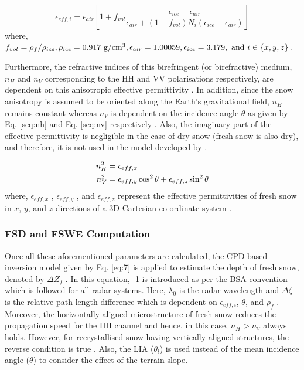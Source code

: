 \documentclass[review]{elsarticle}
\numberwithin{equation}{section}
\numberwithin{figure}{section}
\numberwithin{table}{section}
\begin{document}
\begin{equation}
    \label{eq:5}
	\epsilon_{eff, i} = \epsilon_{air}\left[1 + f_{vol}\frac{\epsilon_{ice} - \epsilon_{air}}{\epsilon_{air} + \left(1 - f_{vol}\right)N_i\left(\epsilon_{ice} - \epsilon_{air}\right)}\right]
\end{equation}
where, $f_{vol} = \rho_f / {\rho_{ice}}, \rho_{ice} = 0.917 \text{ g/cm\textsuperscript{3}}, \epsilon_{air} = 1.00059, \epsilon_{ice} = 3.179, \text{ and } i \in \{x, y, z\}$.

Furthermore, the refractive indices of this birefringent (or birefractive) medium, $n_H$ and $n_V$ corresponding to the HH and VV polarisations respectively, are dependent on this anisotropic effective permittivity \citep{Leinss2014}. In addition, since the snow anisotropy is assumed to be oriented along the Earth’s gravitational field, $n_H$ remains constant whereas $n_V$ is dependent on the incidence angle $\theta$ as given by Eq. \eqref{seq:nh} and Eq. \eqref{seq:nv} respectively \citep{Leinss2016}. Also, the imaginary part of the effective permittivity is negligible in the case of dry snow (fresh snow is also dry), and therefore, it is not used in the model developed by \cite{Leinss2014}.

\begin{subequations}
    \centering
    \begin{align}
        \label{seq:nh}
        n_H^2 &= \epsilon_{eff, x}\\
        \label{seq:nv}
        n_V^2 &= \epsilon_{eff, y}\cos^2\theta + \epsilon_{eff, z}\sin^2\theta 
    \end{align}
\end{subequations}
where, $\epsilon_{eff, x}$ , $\epsilon_{eff, y}$ , and $\epsilon_{eff, z}$ represent the effective permittivities of fresh snow in $x$, $y$, and $z$ directions of a 3D Cartesian co-ordinate system \citep{Leinss2014}.

\subsubsection{FSD and FSWE Computation}

Once all these aforementioned parameters are calculated, the CPD based inversion model given by Eq. \eqref{eq:7} is applied to estimate the depth of fresh snow, denoted by $\Delta{Z_f}$ \citep{Majumdar2019, Leinss2014, Leinss2016}. In this equation, -1 is introduced as per the BSA convention which is followed for all radar systems. Here, $\lambda_0$ is the radar wavelength and $\Delta\zeta$ is the relative path length difference which is dependent on $\epsilon_{eff, i}$, $\theta$, and $\rho_f$ \citep{Leinss2016}. Moreover, the horizontally aligned microstructure of fresh snow reduces the propagation speed for the HH channel and hence, in this case, $n_H > n_V$ always holds. However, for recrystallised snow having vertically aligned structures, the reverse condition is true \citep{Leinss2016}. Also, the LIA ($\theta_l$) is used instead of the mean incidence angle ($\theta$) to consider the effect of the terrain slope.
\end{document}

